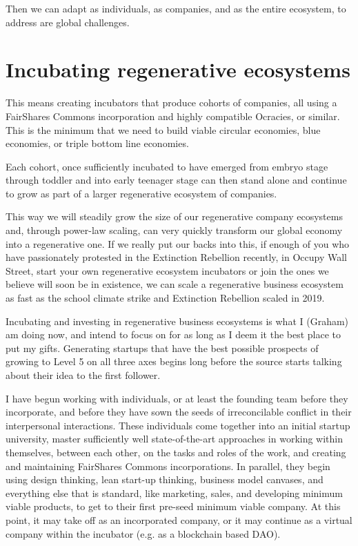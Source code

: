 Then we can adapt as individuals, as companies, and as the entire ecosystem, to address are global challenges.






\section{Incubating regenerative ecosystems}


This means creating incubators that produce cohorts of companies, all using a FairShares Commons  incorporation and highly compatible Ocracies, or similar. This is the minimum that we need to build viable circular economies, blue economies, or triple bottom line economies. 


Each cohort, once sufficiently incubated to have emerged from embryo stage through toddler and into early teenager stage can then stand alone and continue to grow as part of a larger regenerative ecosystem of companies.


This way we will steadily grow the size of our regenerative company ecosystems and, through power-law scaling, can very quickly transform our global economy into a regenerative one. If we really put our backs into this, if enough of you who have passionately protested in the Extinction Rebellion recently, in Occupy Wall Street, start your own regenerative ecosystem incubators or join the ones we believe will soon be in existence, we can scale a regenerative business ecosystem as fast as the school climate strike and Extinction Rebellion scaled in 2019.


Incubating and investing in regenerative business ecosystems is what I (Graham) am doing now, and intend to focus on for as long as I deem it the best place to put my gifts. Generating startups that have the best possible prospects of growing to Level 5 on all three axes begins long before the source starts talking about their idea to the first follower.


I have begun working with individuals, or at least the founding team before they incorporate, and before they have sown the seeds of irreconcilable conflict in their interpersonal interactions. These individuals come together into an initial startup university, master sufficiently well state-of-the-art approaches in working within themselves, between each other, on the tasks and roles of the work, and creating and maintaining FairShares Commons incorporations. In parallel, they begin using design thinking, lean start-up thinking,  business model canvases, and everything else that is standard, like marketing, sales, and developing minimum viable products, to get to their first pre-seed minimum viable company. At this point, it may take off as an incorporated company, or it may continue as a virtual company within the incubator (e.g. as a blockchain based DAO).




